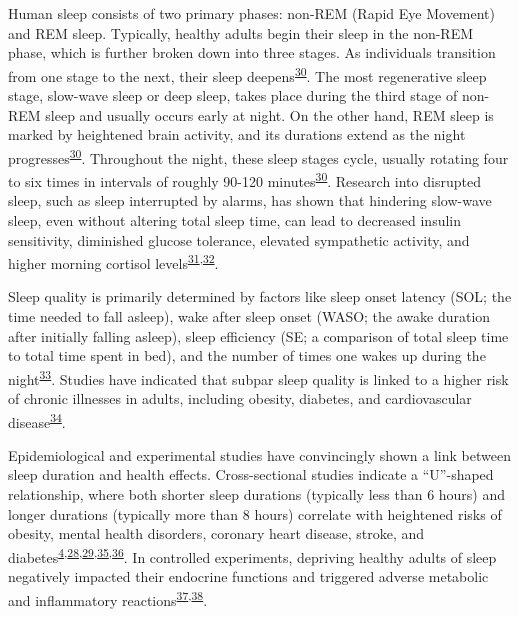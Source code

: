 \documentclass[
  10pt,
]{scrbook}
\begin{document}
Human sleep consists of two primary phases: non-REM (Rapid Eye Movement)
and REM sleep. Typically, healthy adults begin their sleep in the
non-REM phase, which is further broken down into three stages. As
individuals transition from one stage to the next, their sleep
deepens\textsuperscript{\protect\hyperlink{ref-roebuck_2014}{30}}. The
most regenerative sleep stage, slow-wave sleep or deep sleep, takes
place during the third stage of non-REM sleep and usually occurs early
at night. On the other hand, REM sleep is marked by heightened brain
activity, and its durations extend as the night
progresses\textsuperscript{\protect\hyperlink{ref-roebuck_2014}{30}}.
Throughout the night, these sleep stages cycle, usually rotating four to
six times in intervals of roughly 90-120
minutes\textsuperscript{\protect\hyperlink{ref-roebuck_2014}{30}}.
Research into disrupted sleep, such as sleep interrupted by alarms, has
shown that hindering slow-wave sleep, even without altering total sleep
time, can lead to decreased insulin sensitivity, diminished glucose
tolerance, elevated sympathetic activity, and higher morning cortisol
levels\textsuperscript{\protect\hyperlink{ref-stamatakis_2010}{31},\protect\hyperlink{ref-herzog_2013}{32}}.

Sleep quality is primarily determined by factors like sleep onset
latency (SOL; the time needed to fall asleep), wake after sleep onset
(WASO; the awake duration after initially falling asleep), sleep
efficiency (SE; a comparison of total sleep time to total time spent in
bed), and the number of times one wakes up during the
night\textsuperscript{\protect\hyperlink{ref-buysse_2014}{33}}. Studies
have indicated that subpar sleep quality is linked to a higher risk of
chronic illnesses in adults, including obesity, diabetes, and
cardiovascular
disease\textsuperscript{\protect\hyperlink{ref-basnet_2016}{34}}.

Epidemiological and experimental studies have convincingly shown a link
between sleep duration and health effects. Cross-sectional studies
indicate a ``U''-shaped relationship, where both shorter sleep durations
(typically less than 6 hours) and longer durations (typically more than
8 hours) correlate with heightened risks of obesity, mental health
disorders, coronary heart disease, stroke, and
diabetes\textsuperscript{\protect\hyperlink{ref-cappuccio_sleep_2010}{4},\protect\hyperlink{ref-reutrakul_2018}{28},\protect\hyperlink{ref-jouxe3o_2018}{29},\protect\hyperlink{ref-cappuccio_2011}{35},\protect\hyperlink{ref-cappuccio_2008}{36}}.
In controlled experiments, depriving healthy adults of sleep negatively
impacted their endocrine functions and triggered adverse metabolic and
inflammatory
reactions\textsuperscript{\protect\hyperlink{ref-banks_2007}{37},\protect\hyperlink{ref-vancauter_2008}{38}}.
\end{document}
